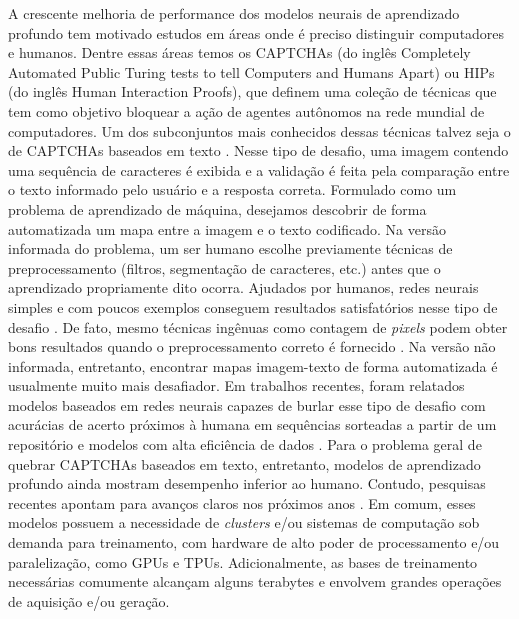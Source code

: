 A crescente melhoria de performance dos modelos neurais de aprendizado profundo tem motivado estudos em áreas onde é preciso distinguir computadores e humanos. Dentre essas áreas temos os CAPTCHAs \cite{captcha2003} (do inglês Completely Automated  Public  Turing  tests  to  tell  Computers  and Humans Apart) ou HIPs \cite{lectures2005HIP} (do inglês Human Interaction Proofs), que definem uma coleção de técnicas que tem como objetivo bloquear a ação de agentes autônomos na rede mundial de computadores. Um dos subconjuntos mais conhecidos dessas técnicas talvez seja o de CAPTCHAs baseados em texto \cite{captcha_review_2017}. Nesse tipo de desafio, uma imagem contendo uma sequência de caracteres é exibida e a validação é feita pela comparação entre o texto informado pelo usuário e a resposta correta. Formulado como um problema de aprendizado de máquina, desejamos descobrir de forma automatizada um mapa entre a imagem e o texto codificado. Na versão informada do problema, um ser humano escolhe previamente técnicas de preprocessamento (filtros, segmentação de caracteres, etc.) antes que o aprendizado propriamente dito ocorra. Ajudados por humanos, redes neurais simples e com poucos exemplos conseguem resultados satisfatórios nesse tipo de desafio \cite{lectures2005HIP}. De fato, mesmo técnicas ingênuas como contagem de \textit{pixels} podem obter bons resultados quando o preprocessamento correto é fornecido \cite{naivecaptcha}. Na versão não informada, entretanto, encontrar mapas imagem-texto de forma automatizada é usualmente muito mais desafiador. Em trabalhos recentes, foram relatados modelos baseados em redes neurais capazes de burlar esse tipo de desafio com acurácias de acerto próximos à humana em sequências sorteadas a partir de um repositório \cite{captcha_break_2013} e modelos com alta eficiência de dados \cite{captcha_break_2017}. Para o problema geral de quebrar CAPTCHAs baseados em texto, entretanto, modelos de aprendizado profundo ainda mostram desempenho inferior ao humano. Contudo, pesquisas recentes apontam para avanços claros nos próximos anos \cite{Bursztein2014TheEI}. Em comum, esses modelos possuem a necessidade de \textit{clusters} e/ou sistemas de computação sob demanda para treinamento, com hardware de alto poder de processamento e/ou paralelização, como GPUs e TPUs. Adicionalmente, as bases de treinamento necessárias comumente alcançam alguns terabytes e envolvem grandes operações de aquisição e/ou geração.

